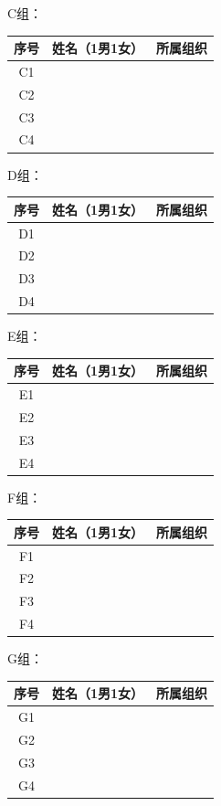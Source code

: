 \documentclass{article}
\begin{document}
\begin{CJK}{UTF8}{gbsn}
\begin{table}[htbp]
	C组：\centering
	\begin{tabular}{|c|c|c|}
		\hline	
		序号& 姓名（1男1女）& 	所属组织\\\hline
		C1	&&\\\hline
		C2	&&	\\\hline
		C3	&&	\\\hline
		C4	&&\\\hline
	\end{tabular}
\end{table}


\begin{table}[htbp]
D组：	\centering
	\begin{tabular}{|c|c|c|}
		\hline	
		序号& 姓名（1男1女）& 	所属组织\\\hline
		D1	&&\\\hline
		D2	&&	\\\hline
		D3	&&	\\\hline
		D4	&&\\\hline
	\end{tabular}
\end{table}


\begin{table}[htbp]
E组：	\centering
	\begin{tabular}{|c|c|c|}
		\hline	
		序号& 姓名（1男1女）& 	所属组织\\\hline
		E1	&&\\\hline
		E2	&&	\\\hline
		E3	&&	\\\hline
		E4	&&\\\hline
	\end{tabular}
\end{table}


\begin{table}[htbp]
F组：	\centering
	\begin{tabular}{|c|c|c|}
		\hline	
		序号& 姓名（1男1女）& 	所属组织\\\hline
		F1	&&\\\hline
		F2	&&	\\\hline
		F3	&&	\\\hline
		F4	&&\\\hline
	\end{tabular}
\end{table}


\begin{table}[htbp]
G组：	\centering
	\begin{tabular}{|c|c|c|}
		\hline	
		序号& 姓名（1男1女）& 	所属组织\\\hline
		G1	&&\\\hline
		G2	&&	\\\hline
		G3	&&	\\\hline
		G4	&&\\\hline
	\end{tabular}
\end{table}



\end{CJK}
\end{document}
